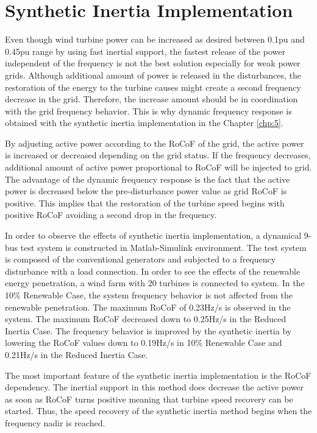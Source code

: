 \section{Synthetic Inertia Implementation}
Even though wind turbine power can be increased as desired between 0.1pu and 0.45pu range by using fast inertial support, the fastest release of the power independent of the frequency is not the best solution especially for weak power grids. Although additional amount of power is released in the disturbances, the restoration of the energy to the turbine causes might create a second frequency decrease in the grid. Therefore, the increase amount should be in coordination with the grid frequency behavior. This is why dynamic frequency response is obtained with the synthetic inertia implementation in the Chapter \ref{chp:5}. \par
By adjusting active power according to the RoCoF of the grid, the active power is increased or decreased depending on the grid status. If the frequency decreases, additional amount of active power proportional to RoCoF will be injected to grid. The advantage of the dynamic frequency response is the fact that the active power is decreased below the pre-disturbance power value as grid RoCoF is positive. This implies that the restoration of the turbine speed begins with positive RoCoF avoiding a second drop in the frequency.\par
In order to observe the effects of synthetic inertia implementation, a dynamical 9-bus test system is constructed in Matlab-Simulink environment. The test system is composed of the conventional generators and subjected to a frequency disturbance with a load connection. In order to see the effects of the renewable energy penetration, a wind farm with 20 turbines is connected to system. In the 10\% Renewable Case, the system frequency behavior is not affected from the renewable penetration. The maximum RoCoF of 0.23Hz/s is observed in the system. The maximum RoCoF decreased down to 0.25Hz/s in the Reduced Inertia Case. The frequency behavior is improved by the synthetic inertia by lowering the RoCoF values down to 0.19Hz/s in 10\% Renewable Case and 0.21Hz/s in the Reduced Inertia Case.
\par
The most important feature of the synthetic inertia implementation is the RoCoF dependency. The inertial support in this method does decrease the active power as soon as RoCoF turns positive meaning that turbine speed recovery can be started. Thus, the speed recovery of the synthetic inertia method begins when the frequency nadir is reached.\par
